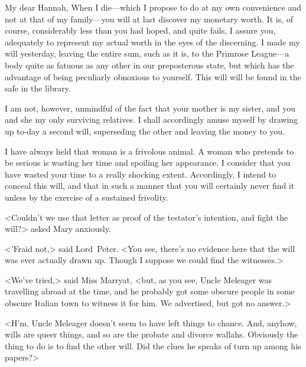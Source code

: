 \begin{a4}
\vspace{-1em}
\end{a4}
\begin{mail}{}{My dear Hannah,}
	When I die—which I propose to do at my own convenience and not at that of my family—you will at last discover my monetary worth. It is, of course, considerably less than you had hoped, and quite fails, I assure you, adequately to represent my actual worth in the eyes of the discerning. I made my will yesterday, leaving the entire sum, such as it is, to the Primrose League—a body quite as fatuous as any other in our preposterous state, but which has the advantage of being peculiarly obnoxious to yourself. This will will be found in the safe in the library.

I am not, however, unmindful of the fact that your mother is my sister, and you and she my only surviving relatives. I shall accordingly amuse myself by drawing up to-day a second will, superseding the other and leaving the money to you.

I have always held that woman is a frivolous animal. A woman who pretends to be serious is wasting her time and spoiling her appearance. I consider that you have wasted your time to a really shocking extent. Accordingly, I intend to conceal this will, and that in such a manner that you will certainly never find it unless by the exercise of a sustained frivolity.
	
\end{mail}

<Couldn't we use that letter as proof of the testator's intention, and fight the will?> asked Mary anxiously.

<'Fraid not,> said Lord~Peter. <You see, there's no evidence here that the will was ever actually drawn up. Though I suppose we could find the witnesses.>

<We've tried,> said Miss Marryat, <but, as you see, Uncle Meleager was travelling abroad at the time, and he probably got some obscure people in some obscure Italian town to witness it for him. We advertised, but got no answer.>

<H'm. Uncle Meleager doesn't seem to have left things to chance. And, anyhow, wills are queer things, and so are the probate and divorce wallahs. Obviously the thing to do is to find the other will. Did the clues he speaks of turn up among his papers?>

